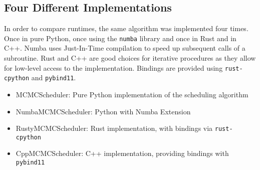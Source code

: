 \subsection{Four Different Implementations}
In order to compare runtimes, the same algorithm was implemented four times.
Once in pure Python, once using the \texttt{numba} library and once in Rust and in C++.
Numba uses Just-In-Time compilation to speed up subsequent calls of a subroutine.
Rust and C++ are good choices for iterative procedures as they allow for low-level access to the implementation. Bindings are provided using \texttt{rust-cpython} and \texttt{pybind11}.

\begin{itemize}
  \item MCMCScheduler: Pure Python implementation of the scheduling algorithm
  \item NumbaMCMCScheduler: Python with Numba Extension
  \item RustyMCMCScheduler: Rust implementation, with bindings via \texttt{rust-cpython}
  \item CppMCMCScheduler: C++ implementation, providing bindings with \texttt{pybind11}
\end{itemize}
